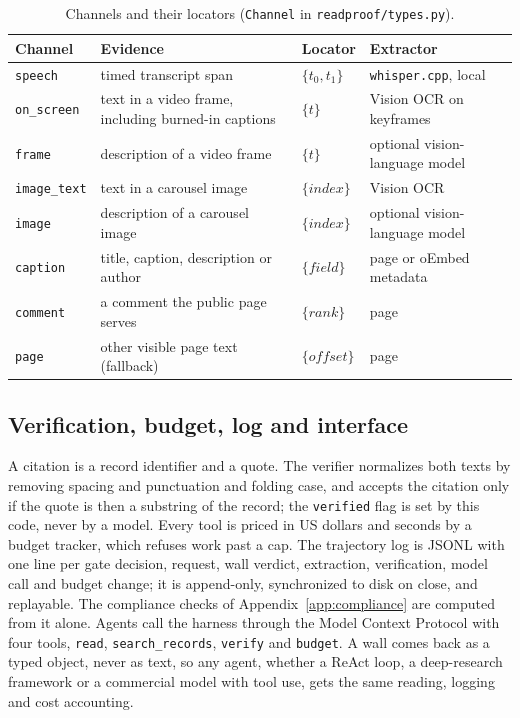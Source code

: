 \documentclass[11pt]{article}
\newcommand{\ch}[1]{\texttt{#1}}%
\begin{document}
\begin{table}[t]
\centering\small
\caption{Channels and their locators (\texttt{Channel} in \texttt{readproof/types.py}).}
\label{tab:channels}
\begin{tabular}{@{}l p{5.0cm} l p{4.6cm}@{}}
\toprule
Channel & Evidence & Locator & Extractor \\
\midrule
\ch{speech} & timed transcript span & $\{t_0, t_1\}$ & \texttt{whisper.cpp}, local \\
\ch{on\_screen} & text in a video frame, including burned-in captions & $\{t\}$ & Vision OCR on keyframes \\
\ch{frame} & description of a video frame & $\{t\}$ & optional vision-language model \\
\ch{image\_text} & text in a carousel image & $\{\mathit{index}\}$ & Vision OCR \\
\ch{image} & description of a carousel image & $\{\mathit{index}\}$ & optional vision-language model \\
\ch{caption} & title, caption, description or author & $\{\mathit{field}\}$ & page or oEmbed metadata \\
\ch{comment} & a comment the public page serves & $\{\mathit{rank}\}$ & page \\
\ch{page} & other visible page text (fallback) & $\{\mathit{offset}\}$ & page \\
\bottomrule
\end{tabular}
\end{table}

\subsection{Verification, budget, log and interface}
A citation is a record identifier and a quote. The verifier normalizes both texts by removing spacing and
punctuation and folding case, and accepts the citation only if the quote is then a substring of the record; the
\texttt{verified} flag is set by this code, never by a model. Every tool is
priced in US dollars and seconds by a budget tracker, which refuses work past a cap. The trajectory log is
JSONL with one line per gate decision, request, wall verdict, extraction, verification, model call and budget
change; it is append-only, synchronized to disk on close, and replayable. The compliance checks of
Appendix~\ref{app:compliance} are computed from it alone. Agents call the harness through the Model Context
Protocol \citep{mcp2026spec} with four tools, \texttt{read}, \texttt{search\_records}, \texttt{verify} and
\texttt{budget}. A wall comes back as a typed object, never as text,
so any agent, whether a ReAct loop, a deep-research framework or a commercial model with tool use, gets the
same reading, logging and cost accounting.
\end{document}
